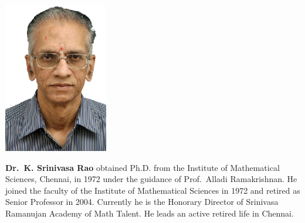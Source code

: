 \centerline{\includegraphics[scale=1.4]{authorsphotos/K_Srinivasa_Rao_photo.eps}}
\bigskip


\noindent
\textbf{Dr.\ K. Srinivasa Rao} obtained Ph.D. from the Institute of Mathematical Sciences, Chennai, in 1972 under the guidance of Prof.\ Alladi Ramakrishnan. He joined the faculty of the Institute of Mathematical Sciences in 1972 and retired as Senior Professor in 2004. Currently he is the Honorary Director of Srinivasa Ramanujan Academy of Math Talent. He leads an active retired life in Chennai.
